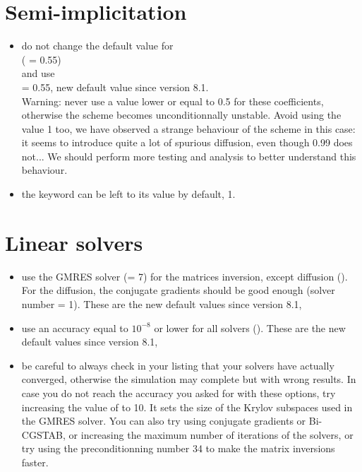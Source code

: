 \section{Semi-implicitation}
\begin{itemize}
\item do not change the default value for\\
   ( = 0.55)\\
  and use \\
   = 0.55, new default value since version 8.1. \\
Warning: never use a value lower or equal to 0.5 for these coefficients,
otherwise the scheme becomes unconditionnally unstable. Avoid using the value 1 too, we have observed a
strange behaviour of the scheme in this case: it seems to introduce quite a lot of spurious diffusion,
even though 0.99 does not... We should perform more testing and analysis to better understand this behaviour.
\item the keyword  can be left to its value by default, 1.
\end{itemize}

\section{Linear solvers}
\begin{itemize}
\item use the GMRES solver (= 7) for the matrices inversion, except diffusion
().
For the diffusion, the conjugate gradients should be good enough (solver number = 1).
These are the new default values since version 8.1,
\item use an accuracy equal to $10^{-8}$ or lower for all solvers
().
These are the new default values since version 8.1,
\item be careful to always check in your listing that your solvers have actually converged,
otherwise the simulation may complete but with wrong results.
In case you do not reach the accuracy you asked for with these options,
try increasing the value of  to 10.
It sets the size of the Krylov subspaces used in the GMRES solver.
You can also try using conjugate gradients or Bi-CGSTAB,
or increasing the maximum number of iterations of the solvers,
or try using the preconditionning number 34 to make the matrix inversions faster.
\end{itemize}

